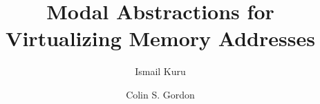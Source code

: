 \documentclass[acmsmall,screen]{acmart}
\begin{document}
\title{Modal Abstractions for Virtualizing Memory Addresses}
\author{Ismail Kuru}
\author{Colin S. Gordon}


\renewcommand{\shortauthors}{Kuru and Gordon}
\end{document}
